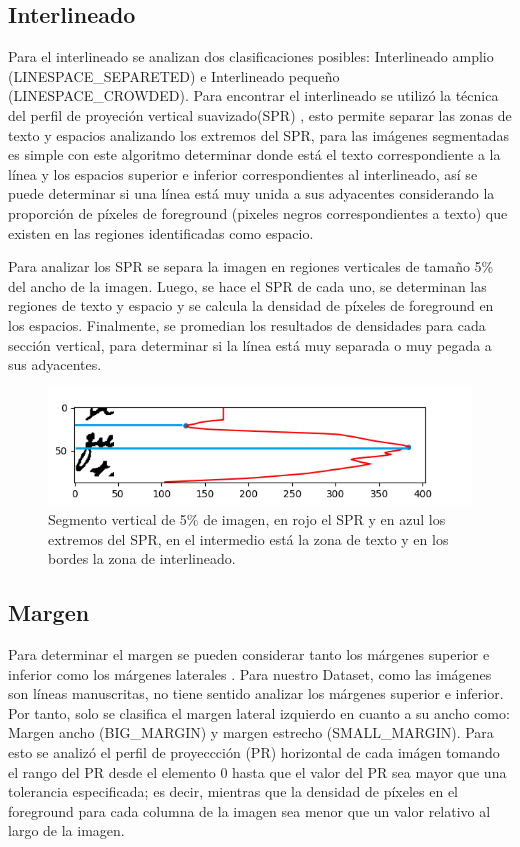 \documentclass[10pt, a4paper]{article}
\begin{document}
        \subsection{Interlineado} 

            Para el interlineado se analizan dos clasificaciones posibles: Interlineado amplio (LINESPACE\_SEPARETED) e Interlineado peque\~no (LINESPACE\_CROWDED). Para encontrar el interlineado se utiliz\'o la t\'ecnica del perfil 
            de proyeci\'on vertical suavizado(SPR) \cite{20}, esto permite separar las zonas de texto y espacios analizando los extremos del SPR, para las im\'agenes segmentadas es simple con este algoritmo determinar donde est\'a el texto correspondiente a la l\'inea y los espacios superior e inferior
            correspondientes al interlineado, as\'i se puede determinar si una l\'inea est\'a muy unida a sus adyacentes considerando la proporci\'on de p\'ixeles de foreground (pixeles negros correspondientes a texto) que existen en 
            las regiones identificadas como espacio.

            Para analizar los SPR se separa la imagen en regiones verticales de tama\~no 5\% del ancho de la imagen. Luego, se hace el SPR de cada uno, se determinan las regiones de texto y espacio \cite{22} y se calcula la densidad 
            de p\'ixeles de foreground en los espacios. Finalmente, se promedian los resultados de densidades para cada secci\'on vertical, para determinar si la l\'inea est\'a muy separada o muy pegada a sus adyacentes. 

            \begin{figure}[!h]
                \centering
                \includegraphics[width = 0.5\linewidth]{Figure_1.png}
                \caption{Segmento vertical de 5\% de imagen, en rojo el SPR y en azul los extremos del SPR, en el intermedio est\'a la zona de texto y en los bordes la zona de interlineado.}
            \end{figure}
        \subsection{Margen} 
        
            Para determinar el margen se pueden considerar tanto los m\'argenes superior e inferior como los m\'argenes laterales \cite{21}. Para nuestro Dataset, como las im\'agenes son l\'ineas manuscritas, no tiene sentido analizar los m\'argenes superior e inferior. Por tanto, solo 
            se clasifica el margen lateral izquierdo en cuanto a su ancho como: Margen ancho (BIG\_MARGIN) y margen estrecho (SMALL\_MARGIN). Para esto se analiz\'o el perfil de proyeccci\'on (PR) horizontal de cada im\'agen tomando el rango del PR desde el elemento 0 hasta que el valor del PR 
            sea mayor que una tolerancia especificada; es decir, mientras que la densidad de p\'ixeles en el foreground para cada columna de la imagen sea menor que un valor relativo al largo de la imagen. 
\end{document}

